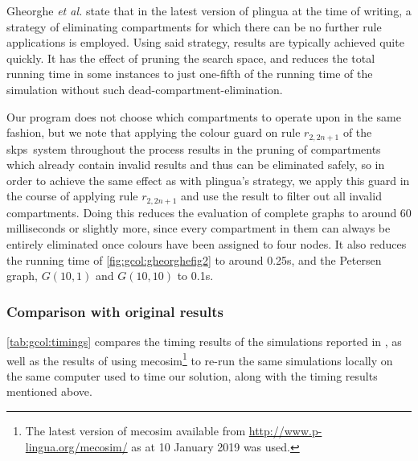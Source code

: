 Gheorghe \textit{et al.} state \cite[p.~828]{Gheorghe2013} that in the latest version of \gls{plingua} at the time of writing, a strategy of eliminating compartments for which there can be no further rule applications is employed.  Using said strategy, results are typically achieved quite quickly.  It has the effect of pruning the search space, and reduces the total running time in some instances to just one-fifth of the running time of the simulation without such dead-compartment-elimination.

Our program does not choose which compartments to operate upon in the same fashion, but we note that applying the colour guard on rule \(r_{2,2n+1}\) of the \gls{skps}~system throughout the process results in the pruning of compartments which already contain invalid results and thus can be eliminated safely, so in order to achieve the same effect as with \gls{plingua}'s strategy, we apply this guard in the course of applying rule \(r_{2,2n+1}\) and use the result to filter out all invalid compartments.  Doing this reduces the evaluation of complete graphs to around 60 milliseconds or slightly more, since every compartment in them can always be entirely eliminated once colours have been assigned to four nodes.  It also reduces the running time of \autoref{fig:gcol:gheorghefig2} to around 0.25s, and the Petersen graph, \(G(10,1)\) and \(G(10,10)\) to 0.1s.

\subsubsection{Comparison with original results}

\autoref{tab:gcol:timings} compares the timing results of the simulations reported in \cite{Gheorghe2013}, as well as the results of using \gls{mecosim}\footnote{The latest version of \gls{mecosim} available from \url{http://www.p-lingua.org/mecosim/} as at 10 January 2019 was used.} \cite{Perez-Hurtado2010} to re-run the same simulations locally on the same computer used to time our solution, along with the timing results mentioned above.


